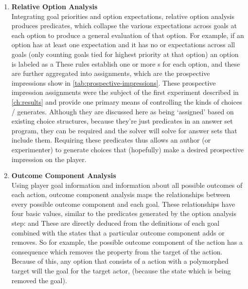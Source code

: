 \begin{enumerate}
\item %
\textbf{Relative Option Analysis} \\
%
Integrating goal priorities and option expectations, relative option analysis produces  predicates, which collapse the various expectations across goals at each option to produce a general evaluation of that option.
%
For example, if an option has at least one  expectation and it has no  or  expectations across all goals (only counting goals tied for highest priority at that option) an option is labeled as a 
%
These rules establish one or more s for each option, and these are further aggregated into  assignments, which are the prospective impressions show in \cref{tab:prospective-impressions}.
%
These prospective impression assignments were the subject of the first experiment described in \cref{ch:results} and provide one primary means of controlling the kinds of choices \dunyazad/ generates.
%
Although they are discussed here as being `assigned' based on existing choice structures, because they're just predicates in an answer set program, they can be required and the solver will solve for answer sets that include them.
%
Requiring these  predicates thus allows an author (or experimenter) to generate choices that (hopefully) make a desired prospective impression on the player.

\item %
\textbf{Outcome Component Analysis} \\
%
Using player goal information and information about all possible outcomes of each action, outcome component analysis maps the relationships between every possible outcome component and each goal.
%
These relationships have four basic values, similar to the  predicates generated by the option analysis step:    and 
%
These are directly deduced from the definitions of each goal combined with the states that a particular outcome component adds or removes.
%
So for example, the  possible outcome component of the  action has a consequence which removes the  property from the target of the action.
%
Because of this, any option that consists of a  action with a polymorphed target will  the  goal for the target actor, (because the  state which is being removed  the  goal).


\end{enumerate}
